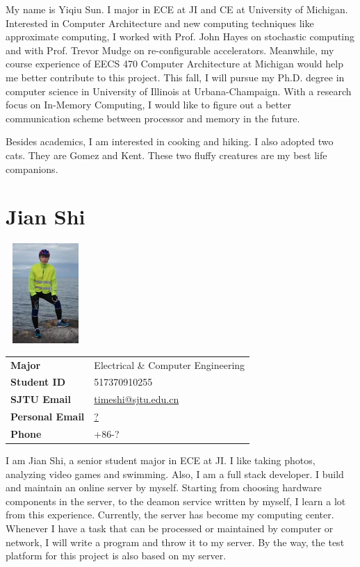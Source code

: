 My name is Yiqiu Sun. I major in ECE at JI and CE at University of Michigan. Interested in Computer Architecture and new computing techniques like approximate computing, I worked with Prof. John Hayes on stochastic computing and with Prof. Trevor Mudge on re-configurable accelerators. Meanwhile, my course experience of EECS 470 Computer Architecture at Michigan would help me better contribute to this project. This fall, I will pursue my Ph.D. degree in computer science in University of Illinois at Urbana-Champaign. With a research focus on In-Memory Computing, I would like to figure out a better communication scheme between processor and memory in the future.

Besides academics, I am interested in cooking and hiking. I also adopted two cats. They are Gomez and Kent. These two fluffy creatures are my best life companions.


\section{Jian Shi}

\begin{minipage}{0.25\textwidth}
  \includegraphics[width=1.2in,height=1.5in,clip,keepaspectratio]{figure/sj.jpg}
\end{minipage}
\begin{minipage}{0.75\textwidth}\raggedright
  \begin{tabular}{l l}
    \textbf{Major}          & Electrical \& Computer Engineering \\
    \textbf{Student ID}     & 517370910255 \\
    \textbf{SJTU Email}     & \url{timeshi@sjtu.edu.cn} \\
    \textbf{Personal Email} & \url{?} \\
    \textbf{Phone}          & +86-?
  \end{tabular}
\end{minipage}

I am Jian Shi, a senior student major in ECE at JI. I like taking photos, analyzing video games and swimming. Also, I am a full stack developer. I build and maintain an online server by myself. Starting from choosing hardware components in the server, to the deamon service written by myself, I learn a lot from this experience. Currently, the server has become my computing center. Whenever I have a task that can be processed or maintained by computer or network, I will write a program and throw it to my server. By the way, the test platform for this project is also based on my server.

